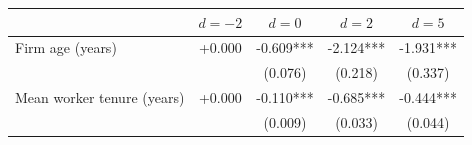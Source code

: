 \begin{tabular}{lcccc}
\toprule
 & $d=-2$ & $d=0$ & $d=2$ & $d=5$ \\
\midrule
Firm age (years) & +0.000 & -0.609*** & -2.124*** & -1.931*** \\
 &  & (0.076) & (0.218) & (0.337) \\
Mean worker tenure (years) & +0.000 & -0.110*** & -0.685*** & -0.444*** \\
 &  & (0.009) & (0.033) & (0.044) \\
\bottomrule
\end{tabular}
